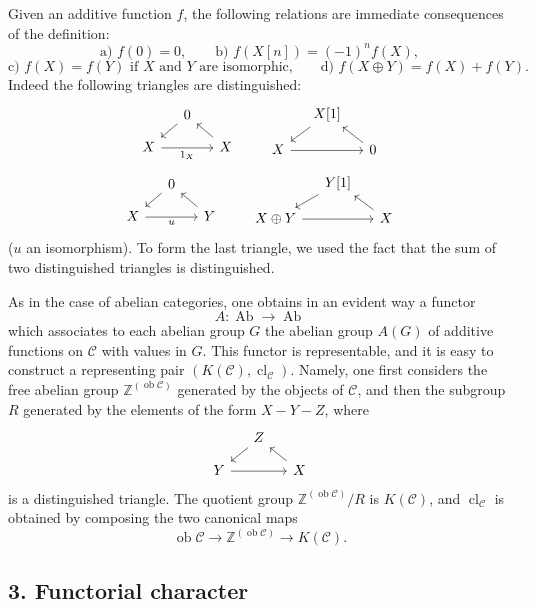 \documentclass[11pt]{article}
\providecommand{\Ob}{\operatorname{ob}}
\providecommand{\cC}{\mathcal C}
\providecommand{\Ob}{\operatorname{ob}}
\providecommand{\Ab}{\operatorname{Ab}}
\providecommand{\cC}{\mathcal C}
\providecommand{\Ab}{\operatorname{Ab}}
\providecommand{\Ob}{\operatorname{Ob}}
\providecommand{\Ob}{\operatorname{ob}}
\begin{document}
Given an additive function $f$, the following relations are immediate consequences of the definition:
\[
\text{a) } f(0)=0,\qquad
\text{b) } f(X[n])=(-1)^n f(X),
\]
\[
\text{c) } f(X)=f(Y)\text{ if }X\text{ and }Y\text{ are isomorphic,}
\qquad
\text{d) } f(X\oplus Y)=f(X)+f(Y).
\]
Indeed the following triangles are distinguished:
\[
\begin{tikzcd}[column sep=small,row sep=small]
&0 \arrow[dl]\\ X \arrow[rr,"1_X"']&&X\arrow[ul]
\end{tikzcd}
\qquad
\begin{tikzcd}[column sep=small,row sep=small]
&X[1]\arrow[dl]\\ X\arrow[rr]&&0\arrow[ul]
\end{tikzcd}
\]
\[
\begin{tikzcd}[column sep=small,row sep=small]
&0\arrow[dl]\\ X\arrow[rr,"u"']&&Y\arrow[ul]
\end{tikzcd}
\qquad
\begin{tikzcd}[column sep=small,row sep=small]
&Y[1]\arrow[dl]\\ X\oplus Y\arrow[rr]&&X\arrow[ul]
\end{tikzcd}
\]
($u$ an isomorphism). To form the last triangle, we used the fact that the sum of two distinguished triangles is distinguished.

As in the case of abelian categories, one obtains in an evident way a functor
\[
A:\Ab\longrightarrow\Ab
\]
which associates to each abelian group $G$ the abelian group $A(G)$ of additive functions on $\cC$ with values in $G$. This functor is representable, and it is easy to construct a representing pair $(K(\cC),\operatorname{cl}_{\cC})$. Namely, one first considers the free abelian group $\mathbb Z^{(\Ob\cC)}$ generated by the objects of $\cC$, and then the subgroup $R$ generated by the elements of the form $X-Y-Z$, where
\[
\begin{tikzcd}[column sep=small,row sep=small]
&Z\arrow[dl]\\ Y\arrow[rr]&&X\arrow[ul]
\end{tikzcd}
\]
is a distinguished triangle. The quotient group $\mathbb Z^{(\Ob\cC)}/R$ is $K(\cC)$, and $\operatorname{cl}_{\cC}$ is obtained by composing the two canonical maps
\[
\Ob\cC\longrightarrow \mathbb Z^{(\Ob\cC)}\longrightarrow K(\cC).
\]

\subsection*{3. Functorial character}
\end{document}
